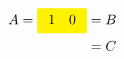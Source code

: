 \documentclass{article}
\begin{document}
\[ \begin{aligned}
A=\colorbox{yellow}{$\begin{array}{cc}1 &0\end{array}$}&=B\\
&=C
\end{aligned} \]
\end{document}
